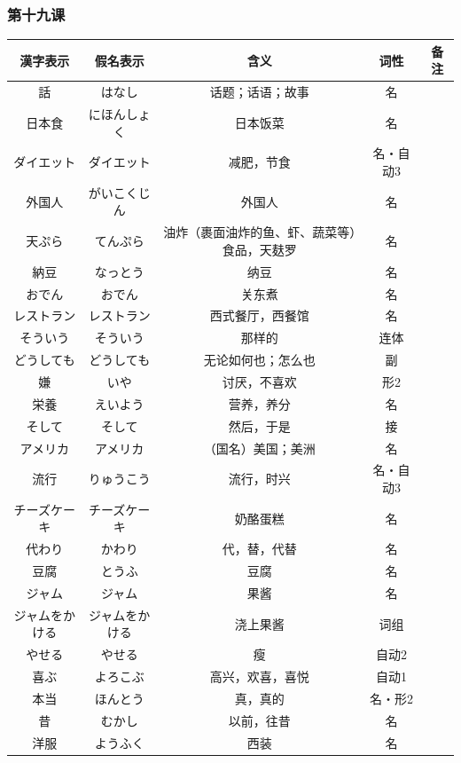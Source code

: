 \subsubsection{第十九课}
\begin{longtable}{|c|c|c|c|c|}
    \hline
漢字表示 & 假名表示  & 含义 & 词性 & 备注 \\ \hline\hline
話 & はなし & 话题；话语；故事 & 名 & \\ \hline
日本食 & にほんしょく & 日本饭菜 & 名 & \\ \hline
ダイエット & ダイエット & 减肥，节食 & 名・自动3 & \\ \hline
外国人 & がいこくじん & 外国人 & 名 & \\ \hline
天ぷら & てんぷら & 油炸（裹面油炸的鱼、虾、蔬菜等）食品，天麸罗 & 名 & \\ \hline
納豆 & なっとう & 纳豆 & 名 & \\ \hline
おでん & おでん & 关东煮 & 名 & \\ \hline
レストラン & レストラン & 西式餐厅，西餐馆 & 名 & \\ \hline
そういう & そういう & 那样的 & 连体 & \\ \hline
どうしても & どうしても & 无论如何也；怎么也 & 副 & \\ \hline
嫌 & いや & 讨厌，不喜欢 & 形2 & \\ \hline
栄養 & えいよう & 营养，养分 & 名 & \\ \hline
そして & そして & 然后，于是 & 接 & \\ \hline
アメリカ & アメリカ & （国名）美国；美洲 & 名 & \\ \hline
流行 & りゅうこう & 流行，时兴 & 名・自动3 & \\ \hline
チーズケーキ & チーズケーキ & 奶酪蛋糕 & 名 & \\ \hline
代わり & かわり & 代，替，代替 & 名 & \\ \hline
豆腐 & とうふ & 豆腐 & 名 & \\ \hline
ジャム & ジャム & 果酱 & 名 & \\ \hline
ジャムをかける & ジャムをかける & 浇上果酱 & 词组 & \\ \hline
やせる & やせる & 瘦 & 自动2 & \\ \hline
喜ぶ & よろこぶ & 高兴，欢喜，喜悦 & 自动1 & \\ \hline
本当 & ほんとう & 真，真的 & 名・形2 & \\ \hline
昔 & むかし & 以前，往昔 & 名 & \\ \hline
洋服 & ようふく & 西装 & 名 & \\ \hline

\end{longtable}
